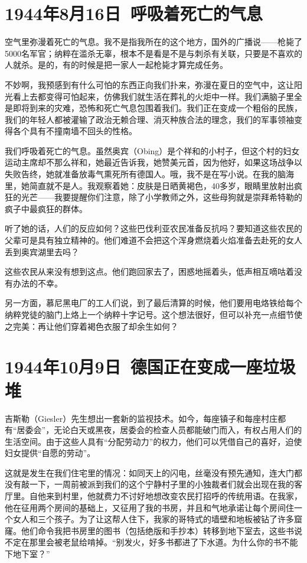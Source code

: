 \documentclass[UTF8]{ctexart}
\begin{document}
\section{1944年8月16日\ 呼吸着死亡的气息}

空气里弥漫着死亡的气息。我不是指我所在的这个地方，国外的广播说——枪毙了5000名军官；纳粹在滥杀无辜，根本不是看是不是与刺杀有关联，只要是不喜欢的人就杀。是的，有的时候是把一家人一起枪毙才算完成任务。

不妙啊，我预感到有什么可怕的东西正向我们扑来，弥漫在夏日的空气中，这让阳光看上去都变得可怕起来，仿佛我们就生活在葬礼的火炬中一样。我们满脑子里全是即将到来的灾难，恐怖和死亡气息包围着我们。我们正在变成一个粗俗的民族，我们的年轻人都被灌输了政治无赖合理、消灭种族合法的理念，我们的军事领袖变得各个具有不撞南墙不回头的性格。

我们呼吸着死亡的气息。虽然奥宾（Obing）是个祥和的小村子，但这个村的妇女运动主席却不那么祥和，她最近告诉我，她赞美元首，因为他好，如果这场战争以失败告终，她就准备放毒气熏死所有德国人。哦，我不是在写小说。在我的脑海里，她简直就不是人。我观察着她：皮肤是日晒黄褐色，40多岁，眼睛里放射出疯狂的光芒——我要提醒你们注意，除了小学教师之外，这些母狗就是崇拜希特勒的疯子中最疯狂的群体。

听了她的话，人们的反应如何？这些巴伐利亚农民准备反抗吗？要知道这些农民的父辈可是具有独立精神的。他们难道不会把这个浑身燃烧着火焰准备去赴死的女人丢到奥宾湖里去吗？

这些农民从来没有想到这点。他们跑回家去了，困惑地摇着头，低声相互嘀咕着没有办法的不幸。

另一方面，慕尼黑电厂的工人们说，到了最后清算的时候，他们要用电烙铁给每个纳粹党徒的脑门上烙上一个纳粹十字记号。这个想法很好，但可以补充一点细节使之完美：再让他们穿着褐色衣服了却余生如何？

\section{1944年10月9日\ 德国正在变成一座垃圾堆}

吉斯勒（Giesler）先生想出一套新的监视技术。如今，每座镇子和每座村庄都有“居委会”，无论白天或黑夜，居委会的检查人员都能破门而入，有权占用人们的生活空间。由于这些人具有“分配劳动力”的权力，他们可以凭借自己的喜好，迫使妇女提供“自愿的劳动”。

这就是发生在我们住宅里的情况：如同天上的闪电，丝毫没有预先通知，连大门都没有敲一下，一周前被派到我们的这个宁静村子里的小独裁者们就会出现在我的客厅里。自他来到村里，他就费力不讨好地想改变农民打招呼的传统用语。在我家，他在征用两个房间的基础上，又征用了我的书房，并且和气地承诺让每个房间住一个女人和三个孩子。为了让这帮人住下，我家的哥特式的墙壁和地板被钻了许多窟窿。他们命令我把书房里的图书（包括绝版和手抄本）转移到地下室去，这些书说不定在那里会被老鼠给啃掉。“别发火，好多书都进了下水道。为什么你的书不能下地下室？”
\end{document}
